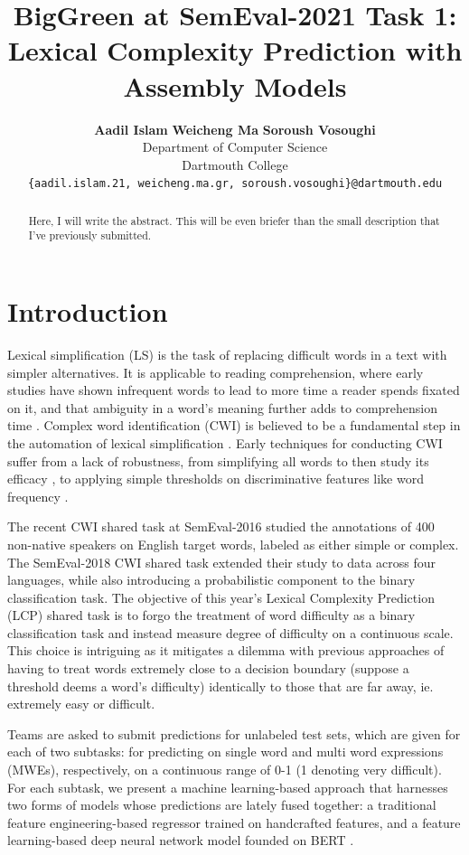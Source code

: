 \documentclass[11pt,a4paper]{article}
\title{BigGreen at SemEval-2021 Task 1: \\
Lexical Complexity Prediction with Assembly Models}
\author{
  \textbf{Aadil Islam}\normalfont{,} \textbf{Weicheng Ma}\normalfont{, and} \textbf{Soroush Vosoughi}\\
  Department of Computer Science\\
  Dartmouth College\\
  \texttt{\{aadil.islam.21, weicheng.ma.gr, soroush.vosoughi\}@dartmouth.edu}
}
\date{}
\begin{document}
\maketitle

\begin{abstract}
  Here, I will write the abstract. This will be even briefer than the small description that I've previously submitted.
\end{abstract}

\section{Introduction}

Lexical simplification (LS) is the task of replacing difficult words in a text with simpler alternatives. It is applicable to reading comprehension, where early studies have shown infrequent words to lead to more time a reader spends fixated on it, and that ambiguity in a word's meaning further adds to comprehension time \citep{raynerd86}. Complex word identification (CWI) is believed to be a fundamental step in the automation of lexical simplification \citep{shardlow2014open}. Early techniques for conducting CWI suffer from a lack of robustness, from simplifying all words to then study its efficacy \citep{devlintait}, to applying simple thresholds on discriminative features like word frequency \citep{10.1007/11573067_19}. 

The recent CWI shared task at SemEval-2016 \citep{paetzoldspecia:2016:SemEval1} studied the annotations of 400 non-native speakers on English target words, labeled as either simple or complex. The SemEval-2018 CWI shared task \citep{stajner-EtAl:2018:BEA} extended their study to data across four languages, while also introducing a probabilistic component to the binary classification task. The objective of this year's Lexical Complexity Prediction (LCP) shared task \citep{shardlow2020complex} is to forgo the treatment of word difficulty as a binary classification task \citep{paetzoldspecia:2016:SemEval1, stajner-EtAl:2018:BEA} and instead measure degree of difficulty on a continuous scale. This choice is intriguing as it mitigates a dilemma with previous approaches of having to treat words extremely close to a decision boundary (suppose a threshold deems a word's difficulty) identically to those that are far away, ie. extremely easy or difficult.

Teams are asked to submit predictions for unlabeled test sets, which are given for each of two subtasks: for predicting on single word and multi word expressions (MWEs), respectively, on a continuous range of 0-1 (1 denoting very difficult). For each subtask, we present a machine learning-based approach that harnesses two forms of models whose predictions are lately fused together: a traditional feature engineering-based regressor trained on handcrafted features, and a feature learning-based deep neural network model founded on BERT \citep{DBLP:journals/corr/abs-1810-04805}. 
\end{document}
